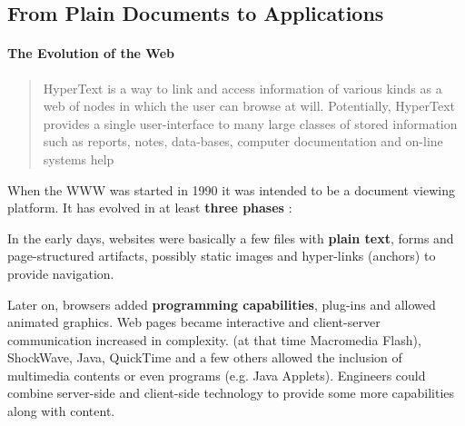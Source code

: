 
%
%

\subsection{From Plain Documents to Applications}
\paragraph{The Evolution of the Web}
\begin{quote} 
HyperText is a way to link and access information of various kinds as a web of nodes in which the user can browse at will. 
Potentially, HyperText provides a single user-interface to many large classes of stored information such as reports, notes, data-bases, computer documentation and on-line systems help\cite{BernersLee:1990}
\end{quote} 

When the \ac{WWW} was started in 1990 it was intended to be a document viewing platform.
It has evolved in at least \textbf{three phases} \cite{Anttonen:2011} \cite{Taivalsaari:2008}:

In the early days, websites were basically a few files with \textbf{plain text}, forms and page-structured artifacts, possibly static images and hyper-links (anchors) to provide navigation. 

Later on, browsers added \textbf{programming capabilities}, plug-ins and allowed animated graphics. 
Web pages became interactive and client-server communication increased in complexity.
\flash (at that time Macromedia Flash), ShockWave, Java, QuickTime and a few others allowed the inclusion of multimedia contents or even programs (e.g. Java Applets).
Engineers could combine server-side and client-side technology to provide some more capabilities along with content.

